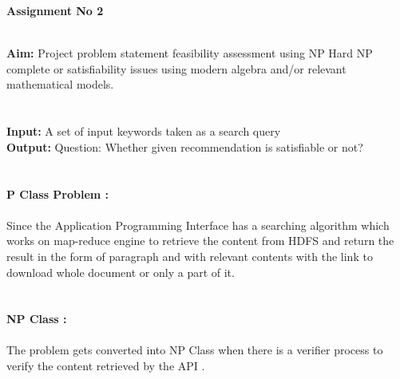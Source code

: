 \documentclass[11pt]{article}
\begin{document}
\noindent
\textbf{
	\large Assignment No 2 \\ \\
} 

\textbf{
	Aim:}
Project problem statement feasibility assessment using NP Hard   NP complete or satisfiability issues  using modern algebra and/or relevant mathematical models. \\ \\ \\


\noindent
\textbf{Input:}  A set of input keywords taken as a search query  \\ 
\textbf{Output:} Question: Whether given recommendation is satisfiable or not? \\ \\ \\

\textbf{P Class Problem : }
\paragraph{}
Since the Application Programming Interface has a searching algorithm which works on map-reduce engine to retrieve the content from HDFS and return the result in the form of paragraph and with relevant contents with the link to download whole document or only a part of it. \\ \\ \\

\textbf{NP Class :}
\paragraph{}
The problem gets converted into NP Class when there is a verifier process to verify the content retrieved by the API . \\ \\ \\
\end{document}
